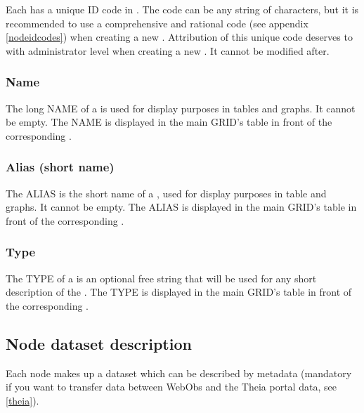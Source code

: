 Each  has a unique ID code in \webobs. The code can be any string of characters, but it is recommended to use a comprehensive and rational code (see appendix \ref{nodeidcodes}) when creating a new . Attribution of this unique code deserves to  with administrator level when creating a new . It cannot be modified after.


\subsubsection{Name}

The long NAME of a  is used for display purposes in tables and graphs. It cannot be empty. The NAME is displayed in the main GRID's table in front of the corresponding .


\subsubsection{Alias (short name)}

The ALIAS is the short name of a , used for display purposes in table and graphs. It cannot be empty. The ALIAS is displayed in the main GRID's table in front of the corresponding .



\subsubsection{Type}

The TYPE of a  is an optional free string that will be used for any short description of the . The TYPE is displayed in the main GRID's table in front of the corresponding .

\subsection{Node dataset description}

Each node makes up a dataset which can be described by metadata (mandatory if you want to transfer data between WebObs and the Theia portal data, see \ref{theia}). 

